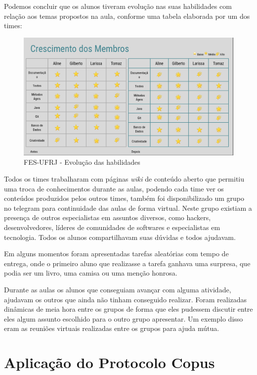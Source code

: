 Podemos concluir que os alunos tiveram evolução nas suas habilidades com relação aos temas propostos na aula, conforme uma tabela elaborada por um dos times:

\begin{figure}
    \centering
    \includegraphics[width=.9\textwidth]{chaps/Images/Habilidades.png}
    \caption{FES-UFRJ - Evolução das habilidades}
    \label{fig:habilidades}
\end{figure}

Todos os times trabalharam com páginas \textit{wiki} de conteúdo aberto que permitiu uma troca de conhecimentos durante as aulas, podendo cada time ver os conteúdos produzidos pelos outros times, também foi disponibilizado um grupo no telegram para continuidade das aulas de forma virtual. Neste grupo existiam a presença de outros especialistas em assuntos diversos, como hackers, desenvolvedores, líderes de comunidades de softwares e especialistas em tecnologia. Todos os alunos compartilhavam suas dúvidas e todos ajudavam. 

Em alguns momentos foram apresentadas tarefas aleatórias com tempo de entrega, onde o primeiro aluno que realizasse a tarefa ganhava uma surpresa, que podia ser um livro, uma camisa ou uma menção honrosa.

Durante as aulas os alunos que conseguiam avançar com alguma atividade, ajudavam os outros que ainda não tinham conseguido realizar. Foram realizadas dinâmicas de meia hora entre os grupos de forma que eles pudessem discutir entre eles algum assunto escolhido para o outro grupo apresentar. Um exemplo disso eram as reuniões virtuais realizadas entre os grupos para ajuda mútua. 

\section{Aplicação do Protocolo Copus}

